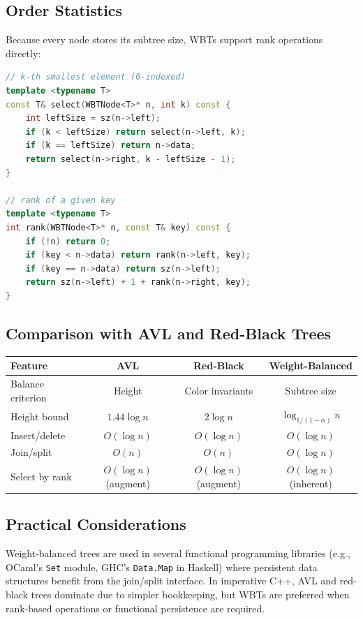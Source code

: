 \subsection{Order Statistics}
\label{sec:wbt-order-statistics}

Because every node stores its subtree size, WBTs support rank operations directly:

\begin{lstlisting}[language=C++]
// k-th smallest element (0-indexed)
template <typename T>
const T& select(WBTNode<T>* n, int k) const {
    int leftSize = sz(n->left);
    if (k < leftSize) return select(n->left, k);
    if (k == leftSize) return n->data;
    return select(n->right, k - leftSize - 1);
}

// rank of a given key
template <typename T>
int rank(WBTNode<T>* n, const T& key) const {
    if (!n) return 0;
    if (key < n->data) return rank(n->left, key);
    if (key == n->data) return sz(n->left);
    return sz(n->left) + 1 + rank(n->right, key);
}
\end{lstlisting}

\subsection{Comparison with AVL and Red-Black Trees}
\label{sec:wbt-comparison}

\begin{center}
\begin{tabular}{lccc}
\toprule
Feature & AVL & Red-Black & Weight-Balanced \\
\midrule
Balance criterion & Height & Color invariants & Subtree size \\
Height bound & $1.44 \log n$ & $2 \log n$ & $\log_{1/(1-\alpha)} n$ \\
Insert/delete & $O(\log n)$ & $O(\log n)$ & $O(\log n)$ \\
Join/split & $O(n)$ & $O(n)$ & $O(\log n)$ \\
Select by rank & $O(\log n)$ (augment) & $O(\log n)$ (augment) & $O(\log n)$ (inherent) \\
\bottomrule
\end{tabular}
\end{center}

\subsection{Practical Considerations}
\label{sec:wbt-practical}

Weight-balanced trees are used in several functional programming libraries (e.g., OCaml's \texttt{Set} module, GHC's \texttt{Data.Map} in Haskell) where persistent data structures benefit from the join/split interface. In imperative C++, AVL and red-black trees dominate due to simpler bookkeeping, but WBTs are preferred when rank-based operations or functional persistence are required.

